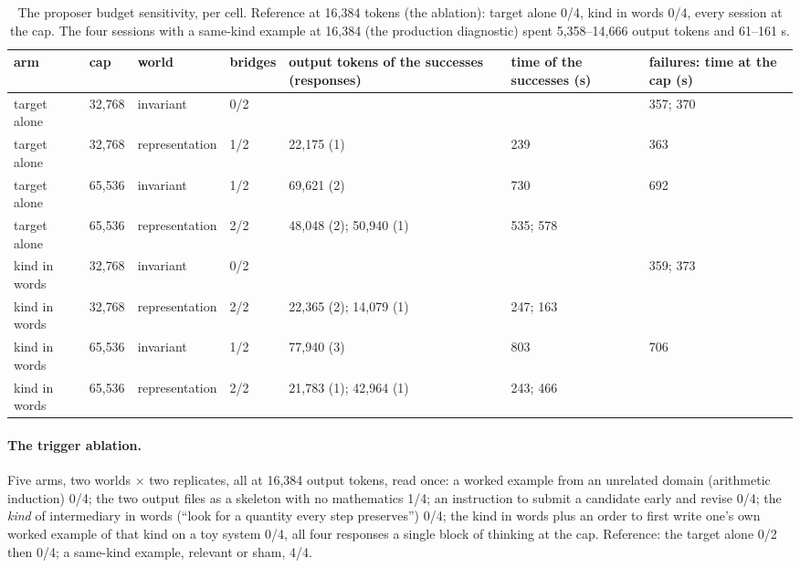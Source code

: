 \documentclass[11pt]{article}
\begin{document}
\begin{table}[!htbp]
\centering\footnotesize
\setlength{\tabcolsep}{3pt}
\begin{tabular}{R{2.3cm} R{1.1cm} R{2.0cm} R{1.1cm} R{2.9cm} R{2.0cm} R{2.6cm}}
\toprule
arm & cap & world & bridges & output tokens of the successes (responses) & time of the successes (s) & failures: time at the cap (s) \\
\midrule
target alone & 32{,}768 & invariant & 0/2 & & & 357; 370 \\
target alone & 32{,}768 & representation & 1/2 & 22{,}175 (1) & 239 & 363 \\
target alone & 65{,}536 & invariant & 1/2 & 69{,}621 (2) & 730 & 692 \\
target alone & 65{,}536 & representation & 2/2 & 48{,}048 (2); 50{,}940 (1) & 535; 578 & \\
kind in words & 32{,}768 & invariant & 0/2 & & & 359; 373 \\
kind in words & 32{,}768 & representation & 2/2 & 22{,}365 (2); 14{,}079 (1) & 247; 163 & \\
kind in words & 65{,}536 & invariant & 1/2 & 77{,}940 (3) & 803 & 706 \\
kind in words & 65{,}536 & representation & 2/2 & 21{,}783 (1); 42{,}964 (1) & 243; 466 & \\
\bottomrule
\end{tabular}
\caption{The proposer budget sensitivity, per cell. Reference at 16{,}384
tokens (the ablation): target alone 0/4, kind in words 0/4, every session
at the cap. The four sessions with a same-kind example at 16{,}384 (the
production diagnostic) spent 5{,}358--14{,}666 output tokens and 61--161 s.}
\label{tab:budget}
\end{table}

\paragraph{The trigger ablation.} Five arms, two worlds $\times$ two
replicates, all at 16{,}384 output tokens, read once: a worked example from
an unrelated domain (arithmetic induction) 0/4; the two output files as a
skeleton with no mathematics 1/4; an instruction to submit a candidate
early and revise 0/4; the \emph{kind} of intermediary in words (``look for
a quantity every step preserves'') 0/4; the kind in words plus an order to
first write one's own worked example of that kind on a toy system 0/4, all
four responses a single block of thinking at the cap. Reference: the
target alone 0/2 then 0/4; a same-kind example, relevant or sham, 4/4.
\end{document}
